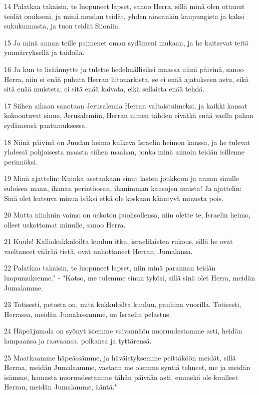 \par 14 Palatkaa takaisin, te luopuneet lapset, sanoo Herra, sillä minä olen ottanut teidät omikseni, ja minä noudan teidät, yhden ainoankin kaupungista ja kaksi sukukunnasta, ja tuon teidät Siioniin.
\par 15 Ja minä annan teille paimenet oman sydämeni mukaan, ja he kaitsevat teitä ymmärryksellä ja taidolla.
\par 16 Ja kun te lisäännytte ja tulette hedelmällisiksi maassa niinä päivinä, sanoo Herra, niin ei enää puhuta Herran liitonarkista, se ei enää ajatukseen astu, eikä sitä enää muisteta; ei sitä enää kaivata, eikä sellaista enää tehdä.
\par 17 Siihen aikaan sanotaan Jerusalemia Herran valtaistuimeksi, ja kaikki kansat kokoontuvat sinne, Jerusalemiin, Herran nimen tähden eivätkä enää vaella pahan sydämensä paatumuksessa.
\par 18 Niinä päivinä on Juudan heimo kulkeva Israelin heimon kanssa, ja he tulevat yhdessä pohjoisesta maasta siihen maahan, jonka minä annoin teidän isillenne perinnöksi.
\par 19 Minä ajattelin: Kuinka asetankaan sinut lasten joukkoon ja annan sinulle suloisen maan, ihanan perintöosan, ihanimman kansojen maista! Ja ajattelin: Sinä olet kutsuva minua isäksi etkä ole koskaan kääntyvä minusta pois.
\par 20 Mutta niinkuin vaimo on uskoton puolisollensa, niin olette te, Israelin heimo, olleet uskottomat minulle, sanoo Herra.
\par 21 Kuule! Kalliokukkuloilta kuuluu itku, israelilaisten rukous, sillä he ovat vaeltaneet väärää tietä, ovat unhottaneet Herran, Jumalansa.
\par 22 Palatkaa takaisin, te luopuneet lapset, niin minä parannan teidän luopumuksenne." - "Katso, me tulemme sinun tykösi, sillä sinä olet Herra, meidän Jumalamme.
\par 23 Totisesti, petosta on, mitä kukkuloilta kuuluu, pauhina vuorilla. Totisesti, Herrassa, meidän Jumalassamme, on Israelin pelastus.
\par 24 Häpeäjumala on syönyt isiemme vaivannäön nuoruudestamme asti, heidän lampaansa ja raavaansa, poikansa ja tyttärensä.
\par 25 Maatkaamme häpeässämme, ja häväistyksemme peittäköön meidät, sillä Herraa, meidän Jumalaamme, vastaan me olemme syntiä tehneet, me ja meidän isämme, hamasta nuoruudestamme tähän päivään asti, emmekä ole kuulleet Herran, meidän Jumalamme, ääntä."

